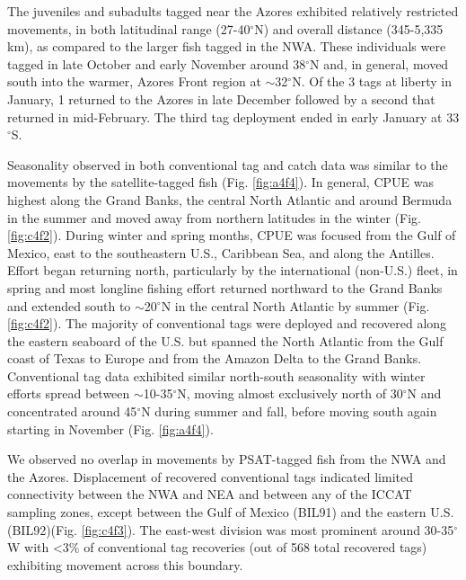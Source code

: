 The juveniles and subadults tagged near the Azores exhibited relatively restricted movements, in both latitudinal range (27-40$^{\circ}$N) and overall distance (345-5,335 km), as compared to the larger fish tagged in the NWA. These individuals were tagged in late October and early November around 38$^{\circ}$N and, in general, moved south into the warmer, Azores Front region at $\sim$32$^{\circ}$N. Of the 3 tags at liberty in January, 1 returned to the Azores in late December followed by a second that returned in mid-February. The third tag deployment ended in early January at 33$^{\circ}$S.

Seasonality observed in both conventional tag and catch data was similar to the movements by the satellite-tagged fish (Fig. \ref{fig:a4f4}). In general, CPUE was highest along the Grand Banks, the central North Atlantic and around Bermuda in the summer and moved away from northern latitudes in the winter (Fig. \ref{fig:c4f2}). During winter and spring months, CPUE was focused from the Gulf of Mexico, east to the southeastern U.S., Caribbean Sea, and along the Antilles. Effort began returning north, particularly by the international (non-U.S.) fleet, in spring and most longline fishing effort returned northward to the Grand Banks and extended south to $\sim$20$^{\circ}$N in the central North Atlantic by summer (Fig. \ref{fig:c4f2}). The majority of conventional tags were deployed and recovered along the eastern seaboard of the U.S. but spanned the North Atlantic from the Gulf coast of Texas to Europe and from the Amazon Delta to the Grand Banks. Conventional tag data exhibited similar north-south seasonality with winter efforts spread between $\sim$10-35$^{\circ}$N, moving almost exclusively north of 30$^{\circ}$N and concentrated around 45$^{\circ}$N during summer and fall, before moving south again starting in November (Fig. \ref{fig:a4f4}).

We observed no overlap in movements by PSAT-tagged fish from the NWA and the Azores. Displacement of recovered conventional tags indicated limited connectivity between the NWA and NEA and between any of the ICCAT sampling zones, except between the Gulf of Mexico (BIL91) and the eastern U.S. (BIL92)(Fig. \ref{fig:c4f3}). The east-west division was most prominent around 30-35$^{\circ}$W with <3\% of conventional tag recoveries (out of 568 total recovered tags) exhibiting movement across this boundary. 

